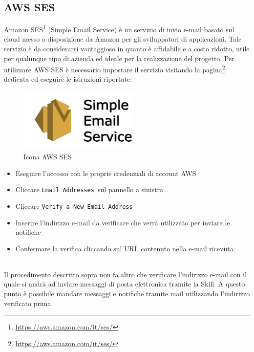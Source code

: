 \subsection{AWS SES}
Amazon SES\footnote{\href{AWS SES. URL: https://aws.amazon.com/it/ses/}{https://aws.amazon.com/it/ses/}} (Simple Email Service) è un servizio di invio e-mail basato sul cloud messo a disposizione da Amazon per gli sviluppatori di applicazioni. Tale servizio è da considerarsi vantaggioso in quanto è affidabile e a costo ridotto, utile per qualunque tipo di azienda ed ideale per la realizzazione del progetto.
\newpage
\noindent Per utilizzare AWS SES è necessario impostare il servizio visitando la pagina\footnote{\href{AWS SES. URL: https://aws.amazon.com/it/ses/}{https://aws.amazon.com/it/ses/}} dedicata ed eseguire le istruzioni riportate:\\[0.5cm]
\begin{minipage}{0.47\textwidth}
	\begin{figure}[H]
		\includegraphics[width=6cm]{immagini/ses.png}
		\caption{\label{fig:icona_aws_ses}Icona AWS SES}
	\end{figure}
\end{minipage}
\begin{minipage}{0.5\textwidth}
	\begin{itemize}
		\item Eseguire l'accesso con le proprie credenziali di account AWS
    	\item Cliccare \texttt{Email Addresses }sul pannello a sinistra
    	\item Cliccare \texttt{Verify a New Email Address}
    	\item Inserire l'indirizzo e-mail da verificare che verrà utilizzato per inviare le notifiche
    	\item Confermare la verifica cliccando sul URL contenuto nella e-mail ricevuta.
	\end{itemize}
\end{minipage}
\\[0.5cm]
Il procedimento descritto sopra non fa altro che verificare l'indirizzo e-mail con il quale si andrà ad inviare messaggi di posta elettronica tramite la Skill. A questo punto è possibile mandare messaggi e notifiche tramite mail utilizzando l'indirizzo verificato prima.
